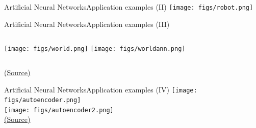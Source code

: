\documentclass[10pt,compress]{beamer} %
\begin{document}
\begin{frame}{Artificial Neural Networks}{Application examples (II)}
	\centering\texttt{[image: figs/robot.png]}
\end{frame}

\begin{frame}{Artificial Neural Networks}{Application examples (III)}
    \begin{columns}
	\centering\texttt{[image: figs/world.png]}
	\centering\texttt{[image: figs/worldann.png]}
    \end{columns}
    \centering \scriptsize\href{https://en.wikibooks.org/wiki/Cyberbotics\%27\_Robot\_Curriculum/}{(Source)}
\end{frame}

\begin{frame}{Artificial Neural Networks}{Application examples (IV)}
	\centering\texttt{[image: figs/autoencoder.png]}\\\smallskip
	\centering\texttt{[image: figs/autoencoder2.png]}\\
	\scriptsize\href{http://i-systems.github.io/HSE545/machine\%20learning\%20all/KIMM/06\_KIMM\_Autoencoder.html}{(Source)}
\end{frame}

\end{document}
